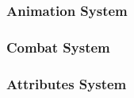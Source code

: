 
\subsubsection{Animation System}





\subsubsection{Combat System}


\subsubsection{Attributes System}



